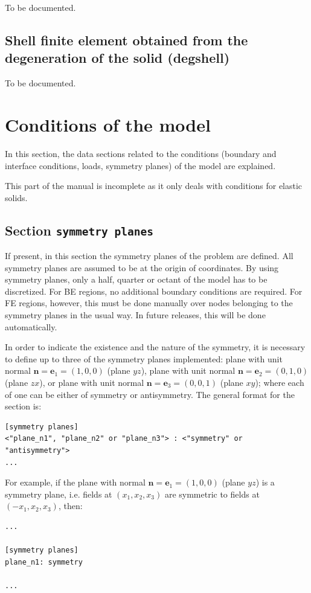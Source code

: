 \documentclass[a4paper,fleqn]{book}
\begin{document}
To be documented.

\subsection{Shell finite element obtained from the degeneration of the solid (degshell)}

To be documented.

\section{Conditions of the model}

In this section, the data sections related to the conditions (boundary and interface conditions, loads, symmetry planes) of the model are explained. 

This part of the manual is incomplete as it only deals with conditions for elastic solids.

\subsection{Section \texttt{symmetry planes}}
If present, in this section the symmetry planes of the problem are defined. All symmetry planes are assumed to be at the origin of coordinates. By using symmetry planes, only a half, quarter or octant of the model has to be discretized. For BE regions, no additional boundary conditions are required. For FE regions, however, this must be done manually over nodes belonging to the symmetry planes in the usual way. In future releases, this will be done automatically.

In order to indicate the existence and the nature of the symmetry, it is necessary to define up to three of the symmetry planes implemented: plane with unit normal $\mathbf{n}=\mathbf{e}_1=(1,0,0)$ (plane $yz$), plane with unit normal $\mathbf{n}=\mathbf{e}_2=(0,1,0)$ (plane $zx$), or plane with unit normal $\mathbf{n}=\mathbf{e}_3=(0,0,1)$ (plane $xy$); where each of one can be either of symmetry or antisymmetry. The general format for the section is:
\begin{Verbatim}[frame=single, fontsize=\small, label={general format of section [symmetry planes]}]
[symmetry planes]
<"plane_n1", "plane_n2" or "plane_n3"> : <"symmetry" or "antisymmetry">
...
\end{Verbatim} 
For example, if the plane with normal $\mathbf{n}=\mathbf{e}_1=(1,0,0)$ (plane $yz$) is a symmetry plane, i.e. fields at $(x_1,x_2,x_3)$ are symmetric to fields at $(-x_1,x_2,x_3)$, then:
\begin{Verbatim}[frame=single, fontsize=\small, label={input.dat}]
...

[symmetry planes]
plane_n1: symmetry

...
\end{Verbatim}
\end{document}

